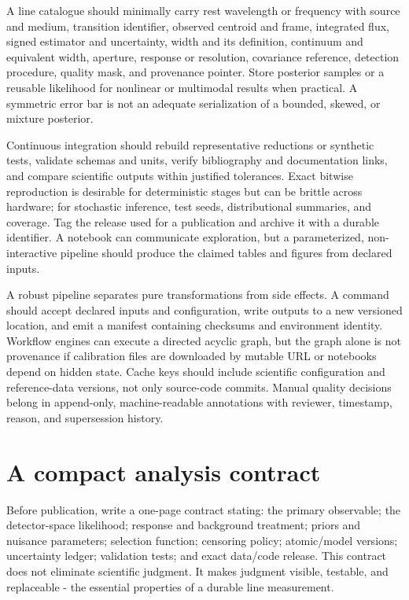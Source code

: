 A line catalogue should minimally carry rest wavelength or frequency with source
and medium, transition identifier, observed centroid and frame, integrated flux,
signed estimator and uncertainty, width and its definition, continuum and
equivalent width, aperture, response or resolution, covariance reference,
detection procedure, quality mask, and provenance pointer.  Store posterior
samples or a reusable likelihood for nonlinear or multimodal results when
practical.  A symmetric error bar is not an adequate serialization of a bounded,
skewed, or mixture posterior.

Continuous integration should rebuild representative reductions or synthetic
tests, validate schemas and units, verify bibliography and documentation links,
and compare scientific outputs within justified tolerances.  Exact bitwise
reproduction is desirable for deterministic stages but can be brittle across
hardware; for stochastic inference, test seeds, distributional summaries, and
coverage.  Tag the release used for a publication and archive it with a durable
identifier.  A notebook can communicate exploration, but a parameterized,
non-interactive pipeline should produce the claimed tables and figures from
declared inputs.

A robust pipeline separates pure transformations from side effects.  A command
should accept declared inputs and configuration, write outputs to a new versioned
location, and emit a manifest containing checksums and environment identity.
Workflow engines can execute a directed acyclic graph, but the graph alone is
not provenance if calibration files are downloaded by mutable URL or notebooks
depend on hidden state.  Cache keys should include scientific configuration and
reference-data versions, not only source-code commits.  Manual quality decisions
belong in append-only, machine-readable annotations with reviewer, timestamp,
reason, and supersession history.

\section{A compact analysis contract}

Before publication, write a one-page contract stating: the primary observable;
the detector-space likelihood; response and background treatment; priors and
nuisance parameters; selection function; censoring policy; atomic/model versions;
uncertainty ledger; validation tests; and exact data/code release.  This contract
does not eliminate scientific judgment.  It makes judgment visible, testable,
and replaceable - the essential properties of a durable line measurement.
